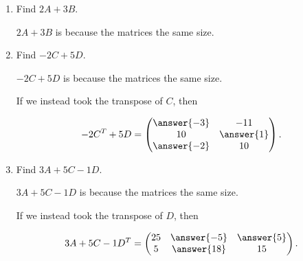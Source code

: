 \documentclass{ximera}
\begin{document}
\begin{enumerate}
\item Find $2A+3B$.


  $2A+3B$ is  because the matrices  the same size.


\item Find $-2C+5D$.



  $-2C+5D$ is  because the matrices  the same size.

\begin{problem}

  If we instead took the transpose of $C$, then 
  
  $$-2C^T+5D=\begin{pmatrix} \answer{-3} & -11 \\ 10 & \answer{1} \\ \answer{-2} & 10 \end{pmatrix}.$$

\end{problem}



\item Find $3A+5C-1D$.



  $3A+5C-1D$ is  because the matrices  the same size.

  \begin{problem}

    If we instead took the transpose of $D$, then 
    
    $$3A+5C-1D^T=\begin{pmatrix} 25 & \answer{-5} & \answer{5} \\ 5 & \answer{18} & 15 \end{pmatrix}.$$

  \end{problem}



\end{enumerate}
\end{document}
